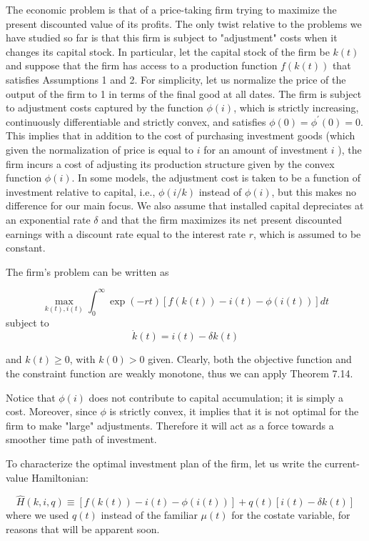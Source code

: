 \documentclass[\topdir/lecture_notes.tex]{subfiles}
\begin{document}
The economic problem is that of a price-taking firm trying to maximize the present discounted value of its profits. The only twist relative to the problems we have studied so far is that this firm is subject to "adjustment" costs when it changes its capital stock. In particular, let the capital stock of the firm be $k(t)$ and suppose that the firm has access to a production function $f(k(t))$ that satisfies Assumptions 1 and 2. For simplicity, let us normalize the price of the output of the firm to 1 in terms of the final good at all dates. The firm is subject to adjustment costs captured by the function $\phi(i)$, which is strictly increasing, continuously differentiable and strictly convex, and satisfies $\phi(0)=\phi^{\prime}(0)=0$. This implies that in addition to the cost of purchasing investment goods (which given the normalization of price is equal to $i$ for an amount of investment $i$ ), the firm incurs a cost of adjusting its production structure given by the convex function $\phi(i)$. In some models, the adjustment cost is taken to be a function of investment relative to capital, i.e., $\phi(i / k)$ instead of $\phi(i)$, but this makes no difference for our main focus. We also assume that installed capital depreciates at an exponential rate $\delta$ and that the firm maximizes its net present discounted earnings with a discount rate equal to the interest rate $r$, which is assumed to be constant.

The firm's problem can be written as

\[
\max _{k(t), i(t)} \int_{0}^{\infty} \exp (-r t)[f(k(t))-i(t)-\phi(i(t))] d t
\]
subject to
\[
\dot{k}(t)=i(t)-\delta k(t)
\]

and $k(t) \geq 0$, with $k(0)>0$ given. Clearly, both the objective function and the constraint function are weakly monotone, thus we can apply Theorem 7.14.

Notice that $\phi(i)$ does not contribute to capital accumulation; it is simply a cost. Moreover, since $\phi$ is strictly convex, it implies that it is not optimal for the firm to make "large" adjustments. Therefore it will act as a force towards a smoother time path of investment.

To characterize the optimal investment plan of the firm, let us write the current-value Hamiltonian:

\[
\hat{H}(k, i, q) \equiv[f(k(t))-i(t)-\phi(i(t))]+q(t)[i(t)-\delta k(t)]
\]
where we used $q(t)$ instead of the familiar $\mu(t)$ for the costate variable, for reasons that will be apparent soon.
\end{document}
